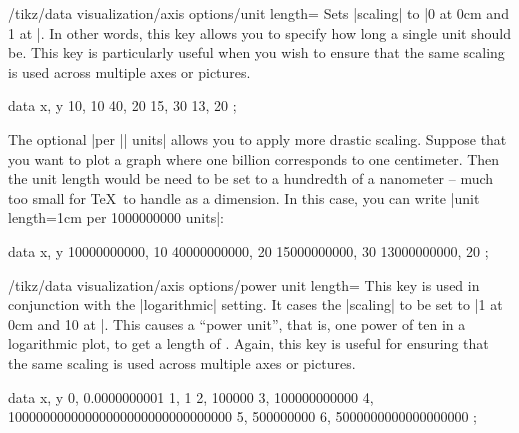 \begin{key}{/tikz/data visualization/axis options/unit length=}
    Sets |scaling| to |0 at 0cm and 1 at |. In other words,
    this key allows you to specify how long a single unit should be. This key
    is particularly useful when you wish to ensure that the same scaling is
    used across multiple axes or pictures.
\begin{codeexample}[preamble={\usetikzlibrary{datavisualization}}]
\tikz \datavisualization [scientific axes,
                          all axes={ticks=few, unit length=1mm},
                          visualize as line]
    data {
      x, y
      10, 10
      40, 20
      15, 30
      13, 20
    };
\end{codeexample}
    The optional |per || units| allows you to apply more drastic
    scaling. Suppose that you want to plot a graph where one billion
    corresponds to one centimeter. Then the unit length would be need to be set
    to a hundredth of a nanometer -- much too small for \TeX\ to handle as a
    dimension. In this case, you can write
    |unit length=1cm per 1000000000 units|:
\begin{codeexample}[preamble={\usetikzlibrary{datavisualization}}]
\tikz \datavisualization
  [scientific axes,
   x axis={unit length=1mm per 1000000000 units, ticks=few},
   visualize as line]
 data {
   x, y
   10000000000, 10
   40000000000, 20
   15000000000, 30
   13000000000, 20
 };
\end{codeexample}
\end{key}
%
\begin{key}{/tikz/data visualization/axis options/power unit length=}
    This key is used in conjunction with the |logarithmic| setting. It cases
    the |scaling| to be set to |1 at 0cm and 10 at |. This
    causes a ``power unit'', that is, one power of ten in a logarithmic plot,
    to get a length of . Again, this key is useful for ensuring
    that the same scaling is used across multiple axes or pictures.
\begin{codeexample}[width=8cm,preamble={\usetikzlibrary{datavisualization}}]
\tikz \datavisualization
  [scientific axes,
   y axis={logarithmic, power unit length=1mm, grid},
   visualize as line]
 data {
   x, y
   0, 0.0000000001
   1, 1
   2, 100000
   3, 100000000000
   4, 10000000000000000000000000000000
   5, 500000000
   6, 5000000000000000000
 };
\end{codeexample}
\end{key}


